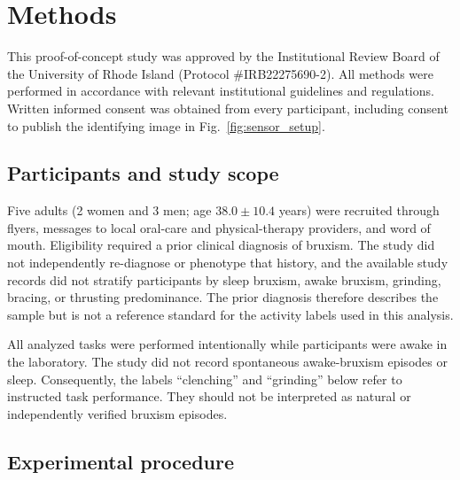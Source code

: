 \documentclass[pdflatex,sn-nature,iicol]{sn-jnl}
\begin{document}
\color{blue}
\section{Methods}
\color{black}

\color{blue}
This proof-of-concept study was approved by the Institutional Review Board of the University of Rhode Island (Protocol \#IRB22275690-2). All methods were performed in accordance with relevant institutional guidelines and regulations. Written informed consent was obtained from every participant, including consent to publish the identifying image in Fig.~\ref{fig:sensor_setup}.
\color{black}

\color{blue}
\subsection{Participants and study scope}
\color{black}

\color{blue}
Five adults (2 women and 3 men; age $38.0 \pm 10.4$ years) were recruited through flyers, messages to local oral-care and physical-therapy providers, and word of mouth. Eligibility required a prior clinical diagnosis of bruxism. The study did not independently re-diagnose or phenotype that history, and the available study records did not stratify participants by sleep bruxism, awake bruxism, grinding, bracing, or thrusting predominance. The prior diagnosis therefore describes the sample but is not a reference standard for the activity labels used in this analysis.
\color{black}

\color{blue}
\color{black}

\color{blue}
All analyzed tasks were performed intentionally while participants were awake in the laboratory. The study did not record spontaneous awake-bruxism episodes or sleep. Consequently, the labels ``clenching'' and ``grinding'' below refer to instructed task performance. They should not be interpreted as natural or independently verified bruxism episodes.
\color{black}

\color{blue}
\subsection{Experimental procedure}
\color{black}
\end{document}

